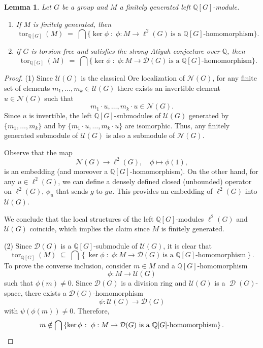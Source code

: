 \documentclass{amsart}
\newtheorem{lem}{Lemma}[section]
\theoremstyle{definition}
\theoremstyle{remark}
\DeclareMathOperator{\D}{\mathcal D}
\DeclareMathOperator{\tor}{tor}
\newcommand{\Q}{\mathbb{Q}}
\begin{document}
\begin{lem}\label{equivdef}
Let $G$ be a group and $M$ a    finitely generated left $\Q[G]$-module. 

\begin{enumerate}
    \item[(1)] If $M$   is finitely generated, then
    \[
\tor_{\mathbb{Q}[G]}(M) \;=\; \bigcap \{ \ker \phi \;\colon\; \phi : M \to \ell^2(G) \ \text{is a $\mathbb{Q}[G]$-homomorphism} \}.
\]
\item [(2)] if $G$ is torsion-free and satisfies the strong Atiyah conjecture over $\mathbb{Q}$, then
\[
\tor_{\mathbb{Q}[G]}(M) \;=\; \bigcap \{ \ker \phi \;\colon\; \phi : M \to \mathcal D(G) \ \text{is a $\mathbb{Q}[G]$-homomorphism} \}.
\]
\end{enumerate}
\end{lem}
\begin{proof}
(1)  Since $\mathcal{U}(G)$ is the classical Ore localization of $\mathcal{N}(G)$, for any finite set of elements $m_1, \ldots, m_k \in \mathcal{U}(G)$ there exists an invertible element $u \in \mathcal{N}(G)$ such that 
\[
m_1 \cdot u, \ldots, m_k \cdot u \in \mathcal{N}(G).
\]
Since $u$ is invertible, the left $\mathbb{Q}[G]$-submodules of $\mathcal{U}(G)$ generated by $\{m_1, \ldots, m_k\}$ and by $\{m_1 \cdot u, \ldots, m_k \cdot u\}$ are isomorphic. Thus, any finitely generated submodule of $\mathcal{U}(G)$ is also a submodule of $\mathcal{N}(G)$.

Observe that the map
\[
\mathcal{N}(G) \longrightarrow \ell^2(G), \quad \phi \mapsto \phi(1),
\]
is an embedding (and moreover a $\mathbb{Q}[G]$-homomorphism). On the other hand, for any $u \in \ell^2(G)$, we can define a densely defined closed (unbounded) operator on $\ell^2(G)$, $\phi_u$ that sends $g$ to $g u$. This provides an embedding of $\ell^2(G)$ into $\mathcal{U}(G)$. 

We conclude that the local structures of the left $\mathbb{Q}[G]$-modules $\ell^2(G)$ and $\mathcal{U}(G)$ coincide, which implies the claim since $M$ is finitely generated.


 (2) Since $\mathcal{D}(G)$ is a $\mathbb{Q}[G]$-submodule of $\mathcal{U}(G)$, it is clear that
\[
\tor_{\mathbb{Q}[G]}(M) \;\subseteq\; \bigcap \left\{ \ker \phi \;\colon\; \phi : M \to \mathcal{D}(G) \ \text{is a $\mathbb{Q}[G]$-homomorphism} \right\}.
\]
To prove the converse inclusion, consider $m \in M$ and a $\mathbb{Q}[G]$-homomorphism 
\[
\phi : M \longrightarrow \mathcal{U}(G)
\]
such that $\phi(m) \neq 0$. Since $\mathcal{D}(G)$ is a division ring and $\mathcal U(G)$ is a $\D(G)$-space, there exists a $\mathcal{D}(G)$-homomorphism 
\[
\psi : \mathcal{U}(G) \longrightarrow \mathcal{D}(G)
\]
with $\psi(\phi(m)) \neq 0$. Therefore,
\[
m \notin \bigcap \left\{ \ker \phi \;\colon\; \phi : M \to \mathcal{D}(G) \ \text{is a $\mathbb{Q}[G]$-homomorphism} \right\}.\qedhere
\]
 \end{proof}
\end{document}
